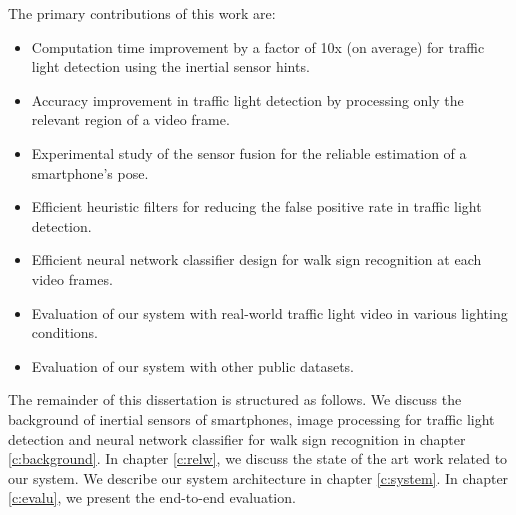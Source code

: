 The primary contributions of this work are:

\begin{itemize}
\item Computation time improvement by a factor of 10x (on average) for traffic light detection using the inertial sensor hints. 
\item Accuracy improvement in traffic light detection by processing only the relevant region of a video frame. 
\item Experimental study of the sensor fusion for the reliable estimation of a smartphone's pose. 
\item Efficient heuristic filters for reducing the false positive rate in traffic light detection.
\item Efficient neural network classifier design for walk sign recognition at each video frames.
\item Evaluation of our system with real-world traffic light video in various lighting conditions. 
\item Evaluation of our system with other public datasets.
  

\end{itemize}

The remainder of this dissertation is structured as follows.
We discuss the background of inertial sensors of smartphones, image processing for traffic light detection and neural network classifier for walk sign recognition in chapter \ref{c:background}.
In chapter \ref{c:relw}, we discuss the state of the art work related to our system.
We describe our system architecture in chapter \ref{c:system}.
In chapter \ref{c:evalu}, we present the end-to-end evaluation.
